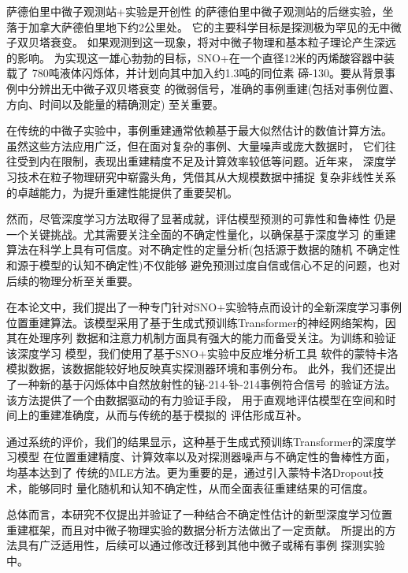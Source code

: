 \begin{cnabstract}

萨德伯里中微子观测站+实验是开创性
的萨德伯里中微子观测站的后继实验，坐落于加拿大萨德伯里地下约2公里处。
它的主要科学目标是探测极为罕见的无中微子双贝塔衰变。
如果观测到这一现象，将对中微子物理和基本粒子理论产生深远的影响。
为实现这一雄心勃勃的目标，SNO+在一个直径12米的丙烯酸容器中装载了
780吨液体闪烁体，并计划向其中加入约1.3吨的同位素
碲-130。要从背景事例中分辨出无中微子双贝塔衰变
的微弱信号，准确的事例重建(包括对事例位置、方向、时间以及能量的精确测定)
至关重要。

在传统的中微子实验中，事例重建通常依赖基于最大似然估计的数值计算方法。
虽然这些方法应用广泛，但在面对复杂的事例、大量噪声或庞大数据时，
它们往往受到内在限制，表现出重建精度不足及计算效率较低等问题。近年来，
深度学习技术在粒子物理研究中崭露头角，凭借其从大规模数据中捕捉
复杂非线性关系的卓越能力，为提升重建性能提供了重要契机。

然而，尽管深度学习方法取得了显著成就，评估模型预测的可靠性和鲁棒性
仍是一个关键挑战。尤其需要关注全面的不确定性量化，以确保基于深度学习
的重建算法在科学上具有可信度。对不确定性的定量分析(包括源于数据的随机
不确定性和源于模型的认知不确定性)不仅能够
避免预测过度自信或信心不足的问题，也对后续的物理分析至关重要。

在本论文中，我们提出了一种专门针对SNO+实验特点而设计的全新深度学习事例
位置重建算法。该模型采用了基于生成式预训练Transformer的神经网络架构，因其在处理序列
数据和注意力机制方面具有强大的能力而备受关注。为训练和验证该深度学习
模型，我们使用了基于SNO+实验中反应堆分析工具
软件的蒙特卡洛模拟数据，该数据能较好地反映真实探测器环境和事例分布。
此外，我们还提出了一种新的基于闪烁体中自然放射性的铋-214-钋-214事例符合信号
的验证方法。该方法提供了一个由数据驱动的有力验证手段，
用于直观地评估模型在空间和时间上的重建准确度，从而与传统的基于模拟的
评估形成互补。

通过系统的评价，我们的结果显示，这种基于生成式预训练Transformer的深度学习模型
在位置重建精度、计算效率以及对探测器噪声与不确定性的鲁棒性方面，均基本达到了
传统的MLE方法。更为重要的是，通过引入蒙特卡洛Dropout技术，能够同时
量化随机和认知不确定性，从而全面表征重建结果的可信度。

总体而言，本研究不仅提出并验证了一种结合不确定性估计的新型深度学习位置
重建框架，而且对中微子物理实验的数据分析方法做出了一定贡献。
所提出的方法具有广泛适用性，后续可以通过修改迁移到其他中微子或稀有事例
探测实验中。


\end{cnabstract}

